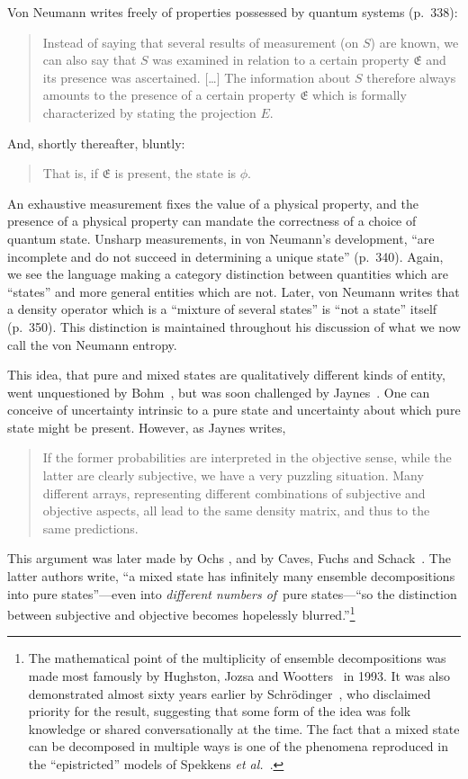 \documentclass[aps,pra,superscriptaddress,12pt,tightenlines,nofootinbib]{revtex4-2}
\begin{document}
Von Neumann writes freely of properties possessed by quantum systems
(p.\ 338):
\begin{quotation}
\noindent Instead of saying that several results of measurement (on
$S$) are known, we can also say that $S$ was examined in relation to a
certain property $\mathfrak{E}$ and its presence was
ascertained. [\ldots\!] The information about $S$ therefore always
amounts to the presence of a certain property $\mathfrak{E}$ which is
formally characterized by stating the projection $E$.
\end{quotation}
And, shortly thereafter, bluntly:
\begin{quotation}
\noindent That is, if $\mathfrak{E}$ is present, the state is $\phi$.
\end{quotation}
An exhaustive measurement fixes the value of a physical property, and
the presence of a physical property can mandate the correctness of a
choice of quantum state.  Unsharp measurements, in von Neumann's
development, ``are incomplete and do not succeed in determining a
unique state'' (p.\ 340).  Again, we see the language making a
category distinction between quantities which are ``states'' and more
general entities which are not.  Later, von Neumann writes that a
density operator which is a ``mixture of several states'' is ``not a
state'' itself (p.\ 350).  This distinction is maintained throughout
his discussion of what we now call the von Neumann entropy.

This idea, that pure and mixed states are qualitatively different
kinds of entity, went unquestioned by Bohm~\cite{Bohm1951}, but was soon
challenged by Jaynes~\cite{Jaynes1957}.  One can conceive of
uncertainty intrinsic to a pure state and uncertainty about which pure
state might be present.  However, as Jaynes writes,
\begin{quotation}
\noindent If the former probabilities are interpreted in the objective
sense, while the latter are clearly subjective, we have a very
puzzling situation.  Many different arrays, representing different
combinations of subjective and objective aspects, all lead to the same
density matrix, and thus to the same predictions.
\end{quotation}
This argument was later made by Ochs \cite{Ochs1981}, and by Caves,
Fuchs and Schack~\cite{CFS2001}.  The latter authors write, ``a mixed
state has infinitely many ensemble decompositions into pure
states''---even into \emph{different numbers of}\!\ pure states---``so
the distinction between subjective and objective becomes hopelessly
blurred.''\footnote{The mathematical point of the multiplicity of
  ensemble decompositions was made most famously by Hughston, Jozsa
  and Wootters~\cite{Hughston1993} in 1993.  It was also demonstrated
  almost sixty years earlier by Schr\"odinger~\cite{Schroedinger1936},
  who disclaimed priority for the result, suggesting that some form of
  the idea was folk knowledge or shared conversationally at the time.
  The fact that a mixed state can be decomposed in multiple ways is
  one of the phenomena reproduced in the ``epistricted'' models of
  Spekkens \emph{et al.}\ \cite{Spekkens2007, Spekkens2014}.}
\end{document}
